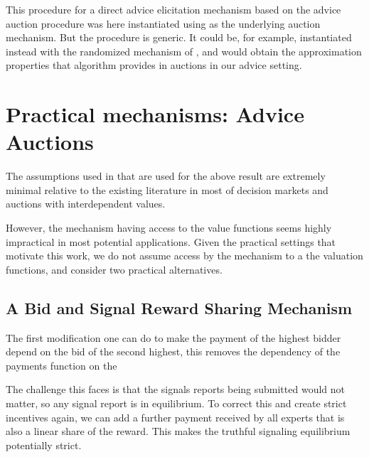 This procedure for a direct advice elicitation mechanism based on the advice auction procedure was here instantiated using \cite{maskin1992auctions}  as the underlying auction mechanism. But the procedure is generic. It could be, for example, instantiated instead with the randomized mechanism of \cite{eden2018interdependent}, and would obtain the approximation properties that algorithm provides in auctions in our advice setting.


\section{Practical mechanisms: Advice Auctions}

The assumptions used in \cite{roughgarden2016optimal} that are used for the above result are extremely minimal relative to the existing literature in most of decision markets and auctions with interdependent values.

However, the mechanism having access to the value functions seems highly impractical in most potential applications.
Given the practical settings that motivate this work, 
we do not assume access by the mechanism to a the valuation functions, and consider two practical alternatives.


\subsection{A Bid and Signal Reward Sharing Mechanism}

The first modification one can do to make the payment of the highest bidder depend on the bid of the second highest, this removes the dependency of the payments function on the 

The challenge this faces is that the signals reports being submitted would not matter, so any signal report is in equilibrium. To correct this and create strict incentives again, we can add a further payment received by all experts that is also a linear share of the reward. This makes the truthful signaling equilibrium potentially strict.


